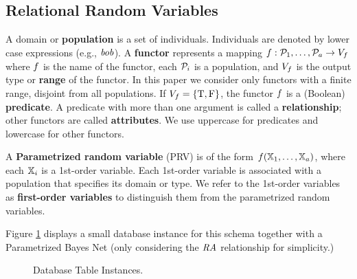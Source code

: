 \documentclass{vldb}
\begin{document}

\subsection{Relational Random Variables} %
A domain or \textbf{population} is a set of individuals.
Individuals are denoted by lower case expressions (e.g., $\it{bob}$). 
A \textbf{functor} represents a mapping
$f: \mathcal{P}_{1},\ldots,\mathcal{P}_{a} \rightarrow V_{f}$
where $f$ is the name of the functor, each $\mathcal{P}_{i}$ is a population, and $V_{f}$ is the output type or \textbf{range} of the functor. 
In this paper we consider only functors with a finite range, disjoint from all populations.  If $V_{f} = \{\mathrm{T},\mathrm{F}\}$, the functor $f$ is a (Boolean) \textbf{predicate}. A predicate with more than one argument is called a \textbf{relationship}; other functors are called \textbf{attributes}. We use uppercase for predicates and lowercase for other functors.




A \textbf{Parametrized random variable} (PRV) is of the form $f(\mathbb{X}_{1},\ldots,\mathbb{X}_{a})$, where each $\mathbb{X}_{i}$ is a 1st-order variable. 
Each 1st-order variable is associated with a population that specifies its domain or type. 
We refer to the 1st-order variables as \textbf{first-order variables} to distinguish them from the parametrized random variables. %


Figure \ref{fig:university-tables} displays a small database instance for this schema together with a Parametrized Bayes Net (only considering the $\mathit{RA}$ relationship for simplicity.) 

 
\begin{figure}[htbp] %
 \centering
{} 
\caption{Database Table Instances.%
}
 \label{fig:university-tables}
\end{figure}
\end{document}
